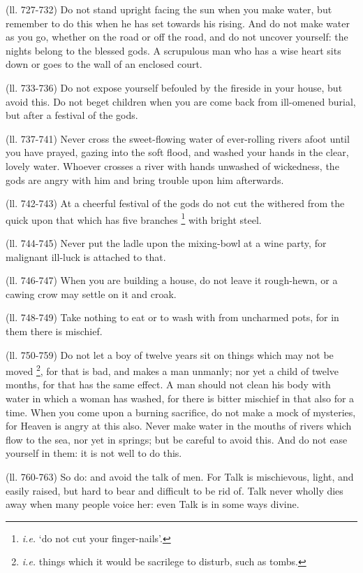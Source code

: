 (ll. 727-732) Do not stand upright facing the sun when you make water, but
remember to do this when he has set towards his rising. And do not make water
as you go, whether on the road or off the road, and do not uncover yourself:
the nights belong to the blessed gods. A scrupulous man who has a wise heart
sits down or goes to the wall of an enclosed court.

(ll. 733-736) Do not expose yourself befouled by the fireside in your house,
but avoid this. Do not beget children when you are come back from ill-omened
burial, but after a festival of the gods.

(ll. 737-741) Never cross the sweet-flowing water of ever-rolling rivers afoot
until you have prayed, gazing into the soft flood, and washed your hands in the
clear, lovely water. Whoever crosses a river with hands unwashed of wickedness,
the gods are angry with him and bring trouble upon him afterwards.

(ll. 742-743) At a cheerful festival of the gods do not cut the withered from
the quick upon that which has five branches \footnote{\emph{i.e.} ‘do not
cut your finger-nails’.} with
bright steel.

(ll. 744-745) Never put the ladle upon the mixing-bowl at a wine party, for
malignant ill-luck is attached to that.

(ll. 746-747) When you are building a house, do not leave it rough-hewn, or a
cawing crow may settle on it and croak.

(ll. 748-749) Take nothing to eat or to wash with from uncharmed pots, for in
them there is mischief.

(ll. 750-759) Do not let a boy of twelve years sit on things which may not be
moved \footnote{\emph{i.e.} things which
it would be sacrilege to disturb, such as tombs.}, for that is bad, and makes a man
unmanly; nor yet a child of twelve months, for that has the same effect. A man
should not clean his body with water in which a woman has washed, for there is
bitter mischief in that also for a time. When you come upon a burning
sacrifice, do not make a mock of mysteries, for Heaven is angry at this also.
Never make water in the mouths of rivers which flow to the sea, nor yet in
springs; but be careful to avoid this. And do not ease yourself in them: it is
not well to do this.

(ll. 760-763) So do: and avoid the talk of men. For Talk is mischievous, light,
and easily raised, but hard to bear and difficult to be rid of. Talk never
wholly dies away when many people voice her: even Talk is in some ways divine.

